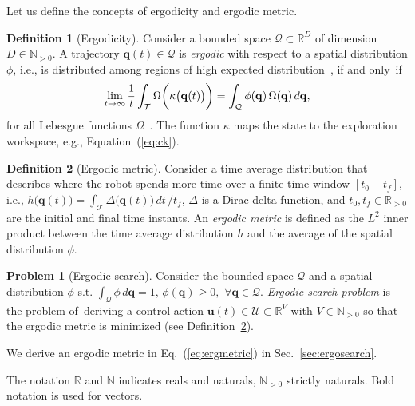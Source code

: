 \documentclass[letterpaper,10pt,conference,twoside]{IEEEtran}
\theoremstyle{definition}
\newtheorem{defn}{Definition}[section]
\newtheorem{pb}{Problem}[section]
\begin{document}
Let us define the concepts of ergodicity and ergodic metric.

\begin{defn}[Ergodicity]
  Consider a bounded space $\mathcal{Q}\subset\mathbb{R}^D$ of dimension $D\in\mathbb{N}_{>0}$. 
  A trajectory $\mathbf{q}(t)\in\mathcal{Q}$ is \textit{ergodic} with respect to a spatial distribution $\phi$, i.e., is distributed among regions of high expected distribution~\cite{miller2016ergodic}, if and only~if
  \begin{equation}
    \lim_{t\rightarrow \infty}{\small
      \frac{1}{t}\int_{\mathcal{T}}\Omega\bigg(\kappa\big(\mathbf{q}(t)\big)\bigg)=\int_{\mathcal{Q}}\phi(\mathbf{q})\,\Omega(\mathbf{q})\,d\mathbf{q},
    }
  \end{equation}
  for all Lebesgue functions $\Omega$~\cite{mathew2011metrics}. The function $\kappa$ maps the state to the exploration workspace, e.g., Equation~(\ref{eq:ck}).
  \end{defn}

\begin{defn}[Ergodic metric]\label{def:ergom}
  Consider a time average distribution that describes where the robot spends more time over a finite time window $[t_0-t_f]$, i.e., $h\big(\mathbf{q}(t)\big)=\int_{\mathcal{T}}{\Delta\big(\mathbf{q}(t)\big)}\,dt\,/t_f$, $\Delta$ is a Dirac delta function, and $t_0,t_f\in\mathbb{R}_{>0}$ are the initial and final time instants. 
  An \textit{ergodic metric} is defined as the $L^2$ inner product between the time average distribution $h$ and the average of the spatial distribution $\phi$.
\end{defn}

\begin{pb}[Ergodic search]\label{pb:ergo}
  Consider the bounded space $\mathcal{Q}$ and a spatial distribution $\phi$ s.t. $\int_{\mathcal{Q}}\phi\,d\mathbf{q}=1,\,\phi(\mathbf{q})\geq 0,\,\, \forall \mathbf{q}\in\mathcal{Q}$.
  \textit{Ergodic search problem} is the problem of~deriving a control action $\mathbf{u}(t)\in\mathcal{U}\subset\mathbb{R}^V$ with $V\in\mathbb{N}_{>0}$ so that the ergodic metric is minimized (see Definition~\ref{def:ergom}). %
\end{pb}

We derive an ergodic metric in Eq.~(\ref{eq:ergmetric}) in Sec.~\ref{sec:ergosearch}.

The notation $\mathbb{R}$ and $\mathbb{N}$ indicates reals and naturals, $\mathbb{N}_{>0}$ strictly naturals. Bold notation is used for vectors.
%
\end{document}
